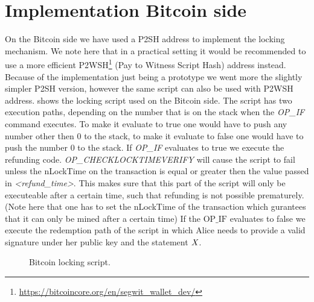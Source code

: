 \section{Implementation Bitcoin side}\label{sec:ImplementationBtc}

On the Bitcoin side we have used a P2SH address to implement the locking mechanism.
We note here that in a practical setting it would be recommended to use a more efficient P2WSH\footnote{\url{https://bitcoincore.org/en/segwit_wallet_dev/}} (Pay to Witness Script Hash) address instead.
Because of the implementation just being a prototype we went more the slightly simpler P2SH version, however the same script can also be used with P2WSH address.
 shows the locking script used on the Bitcoin side.
The script has two execution paths, depending on the number that is on the stack when the \textit{OP\_IF} command executes.
To make it evaluate to true one would have to push any number other then 0 to the stack, to make it evaluate to false one would have to push the number 0 to the stack.
If \textit{OP\_IF} evaluates to true we execute the refunding code.
\textit{OP\_CHECKLOCKTIMEVERIFY} will cause the script to fail unless the nLockTime on the transaction is equal or greater then the value passed in \textit{<refund\_time>}.
This makes sure that this part of the script will only be executeable after a certain time, such that refunding is not possible prematurely.
(Note here that one has to set the nLockTime of the transaction which gurantees that it can only be mined after a certain time)
If the $\text{OP\_IF}$ evaluates to false we execute the redemption path of the script in which Alice needs to provide a valid signature under her public key and the statement $\mathit{X}$.

\begin{figure}
    \begin{center}
    \end{center}
    \caption{Bitcoin locking script.}\label{fig:bitcoin-script}
\end{figure}

